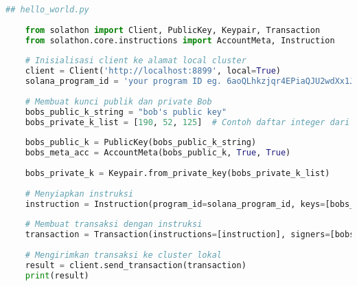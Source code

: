 \begin{lstlisting}[language=Python]
	## hello_world.py
	
	from solathon import Client, PublicKey, Keypair, Transaction
	from solathon.core.instructions import AccountMeta, Instruction
	
	# Inisialisasi client ke alamat local cluster
	client = Client('http://localhost:8899', local=True)
	solana_program_id = 'your program ID eg. 6aoQLhkzjqr4EPiaQJU2wdXx1J6E5qTLkWkqkFyaNiLo'
	
	# Membuat kunci publik dan private Bob
	bobs_public_k_string = "bob's public key"
	bobs_private_k_list = [190, 52, 125]  # Contoh daftar integer dari JSON file Bob
	
	bobs_public_k = PublicKey(bobs_public_k_string)
	bobs_meta_acc = AccountMeta(bobs_public_k, True, True)
	
	bobs_private_k = Keypair.from_private_key(bobs_private_k_list)
	
	# Menyiapkan instruksi
	instruction = Instruction(program_id=solana_program_id, keys=[bobs_meta_acc], data=bytes(0))
	
	# Membuat transaksi dengan instruksi
	transaction = Transaction(instructions=[instruction], signers=[bobs_private_k])
	
	# Mengirimkan transaksi ke cluster lokal
	result = client.send_transaction(transaction)
	print(result)
\end{lstlisting}

